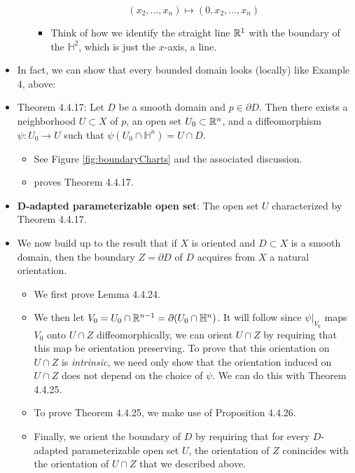 \documentclass[../notes.tex]{subfiles}
\begin{document}
\begin{itemize}
\begin{enumerate}
        \begin{equation*}
            (x_2,\dots,x_n) \mapsto (0,x_2,\dots,x_n)
        \end{equation*}
        \begin{itemize}
            \item Think of how we identify the straight line $\mathbb{R}^1$ with the boundary of the $\mathbb{H}^2$, which is just the $x$-axis, a line.
        \end{itemize}
    \end{enumerate}
    \item In fact, we can show that every bounded domain looks (locally) like Example 4, above:
    \item Theorem 4.4.17: Let $D$ be a smooth domain and $p\in\partial D$. Then there exists a neighborhood $U\subset X$ of $p$, an open set $U_0\subset\mathbb{R}^n$, and a diffeomorphism $\psi:U_0\to U$ such that $\psi(U_0\cap\mathbb{H}^n)=U\cap D$.
    \begin{itemize}
        \item See Figure \ref{fig:boundaryCharts} and the associated discussion.
        \item \textcite{bib:DifferentialForms} proves Theorem 4.4.17.
    \end{itemize}
    \item \textbf{$\bm{D}$-adapted parameterizable open set}: The open set $U$ characterized by Theorem 4.4.17.
    \item We now build up to the result that if $X$ is oriented and $D\subset X$ is a smooth domain, then the boundary $Z=\partial D$ of $D$ acquires from $X$ a natural orientation.
    \begin{itemize}
        \item We first prove Lemma 4.4.24.
        \item We then let $V_0=U_0\cap\mathbb{R}^{n-1}=\partial(U_0\cap\mathbb{H}^n)$. It will follow since $\psi|_{V_0}$ maps $V_0$ onto $U\cap Z$ diffeomorphically, we can orient $U\cap Z$ by requiring that this map be orientation preserving. To prove that this orientation on $U\cap Z$ is \emph{intrinsic}, we need only show that the orientation induced on $U\cap Z$ does not depend on the choice of $\psi$. We can do this with Theorem 4.4.25.
        \item To prove Theorem 4.4.25, we make use of Proposition 4.4.26.
        \item Finally, we orient the boundary of $D$ by requiring that for every $D$-adapted parameterizable open set $U$, the orientation of $Z$ conincides with the orientation of $U\cap Z$ that we described above.

\end{itemize}
\end{itemize}
\end{document}
